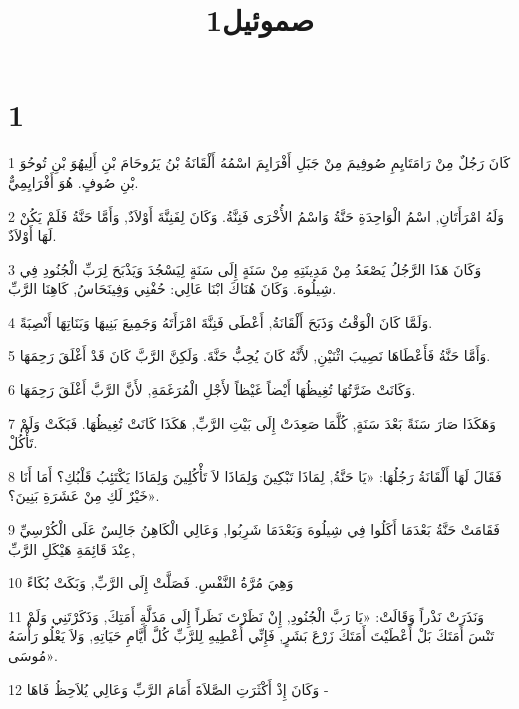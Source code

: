 

\title{صموئيل1}


\chapter{1}

\par 1 كَانَ رَجُلٌ مِنْ رَامَتَايِمِ صُوفِيمَ مِنْ جَبَلِ أَفْرَايِمَ اسْمُهُ أَلْقَانَةُ بْنُ يَرُوحَامَ بْنِ أَلِيهُوَ بْنِ تُوحُوَ بْنِ صُوفٍ. هُوَ أَفْرَايِمِيٌّ.
\par 2 وَلَهُ امْرَأَتَانِ, اسْمُ الْوَاحِدَةِ حَنَّةُ وَاسْمُ الأُخْرَى فَنِنَّةُ. وَكَانَ لِفَنِنَّةَ أَوْلاَدٌ, وَأَمَّا حَنَّةُ فَلَمْ يَكُنْ لَهَا أَوْلاَدٌ.
\par 3 وَكَانَ هَذَا الرَّجُلُ يَصْعَدُ مِنْ مَدِينَتِهِ مِنْ سَنَةٍ إِلَى سَنَةٍ لِيَسْجُدَ وَيَذْبَحَ لِرَبِّ الْجُنُودِ فِي شِيلُوهَ. وَكَانَ هُنَاكَ ابْنَا عَالِي: حُفْنِي وَفِينَحَاسُ, كَاهِنَا الرَّبِّ.
\par 4 وَلَمَّا كَانَ الْوَقْتُ وَذَبَحَ أَلْقَانَةُ, أَعْطَى فَنِنَّةَ امْرَأَتَهُ وَجَمِيعَ بَنِيهَا وَبَنَاتِهَا أَنْصِبَةً.
\par 5 وَأَمَّا حَنَّةُ فَأَعْطَاهَا نَصِيبَ اثْنَيْنِ, لأَنَّهُ كَانَ يُحِبُّ حَنَّةَ. وَلَكِنَّ الرَّبَّ كَانَ قَدْ أَغْلَقَ رَحِمَهَا.
\par 6 وَكَانَتْ ضَرَّتُهَا تُغِيظُهَا أَيْضاً غَيْظاً لأَجْلِ الْمُرَغَمَةِ, لأَنَّ الرَّبَّ أَغْلَقَ رَحِمَهَا.
\par 7 وَهَكَذَا صَارَ سَنَةً بَعْدَ سَنَةٍ, كُلَّمَا صَعِدَتْ إِلَى بَيْتِ الرَّبِّ, هَكَذَا كَانَتْ تُغِيظُهَا. فَبَكَتْ وَلَمْ تَأْكُلْ.
\par 8 فَقَالَ لَهَا أَلْقَانَةُ رَجُلُهَا: «يَا حَنَّةُ, لِمَاذَا تَبْكِينَ وَلِمَاذَا لاَ تَأْكُلِينَ وَلِمَاذَا يَكْتَئِبُ قَلْبُكِ؟ أَمَا أَنَا خَيْرٌ لَكِ مِنْ عَشَرَةِ بَنِينَ؟».
\par 9 فَقَامَتْ حَنَّةُ بَعْدَمَا أَكَلُوا فِي شِيلُوهَ وَبَعْدَمَا شَرِبُوا, وَعَالِي الْكَاهِنُ جَالِسٌ عَلَى الْكُرْسِيِّ عِنْدَ قَائِمَةِ هَيْكَلِ الرَّبِّ,
\par 10 وَهِيَ مُرَّةُ النَّفْسِ. فَصَلَّتْ إِلَى الرَّبِّ, وَبَكَتْ بُكَاءً
\par 11 وَنَذَرَتْ نَذْراً وَقَالَتْ: «يَا رَبَّ الْجُنُودِ, إِنْ نَظَرْتَ نَظَراً إِلَى مَذَلَّةِ أَمَتِكَ, وَذَكَرْتَنِي وَلَمْ تَنْسَ أَمَتَكَ بَلْ أَعْطَيْتَ أَمَتَكَ زَرْعَ بَشَرٍ, فَإِنِّي أُعْطِيهِ لِلرَّبِّ كُلَّ أَيَّامِ حَيَاتِهِ, وَلاَ يَعْلُو رَأْسَهُ مُوسَى».
\par 12 وَكَانَ إِذْ أَكْثَرَتِ الصَّلاَةَ أَمَامَ الرَّبِّ وَعَالِي يُلاَحِظُ فَاهَا -
